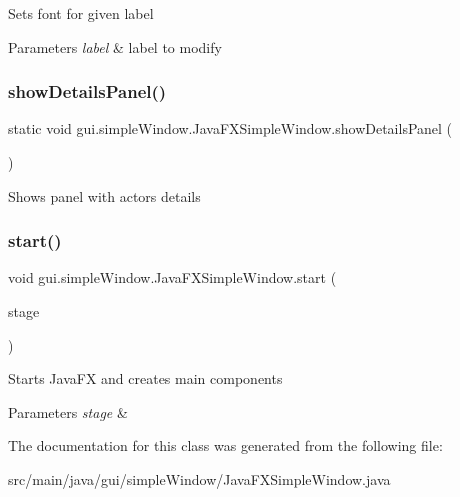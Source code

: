 Sets font for given label 
\begin{DoxyParams}{Parameters}
{\em label} & label to modify \\
\hline
\end{DoxyParams}
\mbox{\label{classgui_1_1simple_window_1_1_java_f_x_simple_window_a04c15534cde88328f9b6933774fa87e3}} 
\subsubsection{\texorpdfstring{show\+Details\+Panel()}{showDetailsPanel()}}
{\footnotesize\ttfamily static void gui.\+simple\+Window.\+Java\+F\+X\+Simple\+Window.\+show\+Details\+Panel (\begin{DoxyParamCaption}{ }\end{DoxyParamCaption})\hspace{0.3cm}{\ttfamily [static]}}

Shows panel with actor\textquotesingle{}s details \mbox{\label{classgui_1_1simple_window_1_1_java_f_x_simple_window_a7b20469c1f1382b5d082c8ba85676777}} 
\subsubsection{\texorpdfstring{start()}{start()}}
{\footnotesize\ttfamily void gui.\+simple\+Window.\+Java\+F\+X\+Simple\+Window.\+start (\begin{DoxyParamCaption}\item[{final Stage}]{stage }\end{DoxyParamCaption})}

Starts Java\+FX and creates main components 
\begin{DoxyParams}{Parameters}
{\em stage} & \\
\hline
\end{DoxyParams}


The documentation for this class was generated from the following file\+:\begin{DoxyCompactItemize}
\item 
src/main/java/gui/simple\+Window/Java\+F\+X\+Simple\+Window.\+java\end{DoxyCompactItemize}
